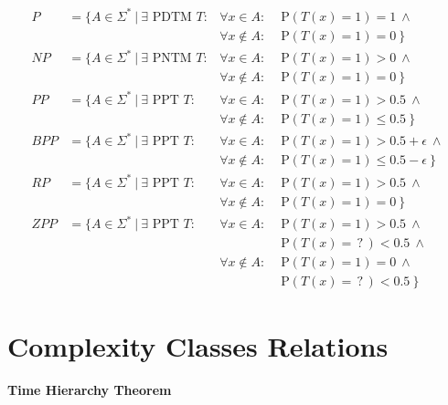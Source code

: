\documentclass[
    13pt,
    oneside,
    a4paper,
    numbers=enddot,
    abstractoff,
    parskip=full
]{scrreprt}
\begin{document}
\begin{align*}
    P & = \{
    A \in \Sigma^\ast ~|~
    \exists \text{ PDTM } T:
    & \forall x \in A:      & \text{ P}(T(x)=1) = 1 ~\land \\
    & & \forall x \notin A: & \text{ P}(T(x)=1) = 0 ~\}
    \\
    NP & = \{
    A \in \Sigma^\ast ~|~
    \exists \text{ PNTM } T:
    & \forall x \in A:      & \text{ P}(T(x)=1) > 0 ~\land \\
    & & \forall x \notin A: & \text{ P}(T(x)=1) = 0 ~\}
    \\
    PP & = \{
    A \in \Sigma^\ast ~|~
    \exists \text{ PPT } T:
    & \forall x \in A:      & \text{ P}(T(x)=1) > 0.5 ~\land \\
    & & \forall x \notin A: & \text{ P}(T(x)=1) \leq 0.5 ~\}
    \\
    BPP & = \{
    A \in \Sigma^\ast ~|~
    \exists \text{ PPT } T:
    & \forall x \in A:      & \text{ P}(T(x)=1) > 0.5 + \epsilon ~\land \\
    & & \forall x \notin A: & \text{ P}(T(x)=1) \leq 0.5 - \epsilon ~\}
    \\
    RP & = \{
    A \in \Sigma^\ast ~|~
    \exists \text{ PPT } T:
    & \forall x \in A:      & \text{ P}(T(x)=1) > 0.5 ~\land \\
    & & \forall x \notin A: & \text{ P}(T(x)=1) = 0 ~\}
    \\
    ZPP & = \{
    A \in \Sigma^\ast ~|~
    \exists \text{ PPT } T:
    & \forall x \in A:      & \text{ P}(T(x)=1) > 0.5 ~\land \\
    & &                     & \text{ P}(T(x)=\,?\,) < 0.5 ~\land \\
    & & \forall x \notin A: & \text{ P}(T(x)=1) = 0 ~\land \\
    & &                     & \text{ P}(T(x)=\,?\,) < 0.5 ~\}
\end{align*}








\chapter*{Complexity Classes Relations}



\subsubsection*{Time Hierarchy Theorem}
\end{document}
